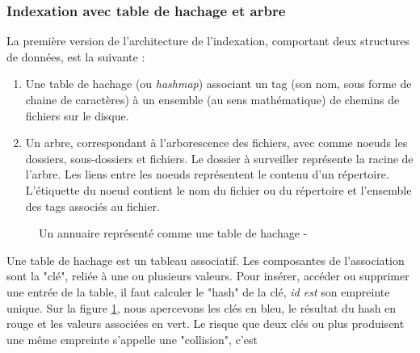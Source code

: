 \documentclass[a4paper, 12pt]{article}
\begin{document}
\subsubsection{Indexation avec table de hachage et arbre}\label{indexation_hashmap_arbre}
La première version de l'architecture de l'indexation, comportant deux structures 
de données, est la suivante :
\begin{enumerate}
    \item Une table de hachage (ou \textit{hashmap}) associant un tag (son nom, sous forme de 
        chaine de caractères) à un ensemble (au sens mathématique) de chemins de fichiers sur 
        le disque.
    \item Un arbre, correspondant à l'arborescence des fichiers, avec comme noeuds les dossiers, 
        sous-dossiers et fichiers. Le dossier à surveiller représente la racine de l'arbre.
        Les liens entre les noeuds représentent le contenu d'un répertoire. L'étiquette du noeud 
        contient le nom du fichier ou du répertoire et l'ensemble des tags associés au fichier.
\end{enumerate}
\begin{figure}
    \begin{center}
    \end{center}
    \caption{Un annuaire représenté comme une table de hachage - \cite{ref27}}
    \label{hashmap_wiki}
\end{figure}
Une table de hachage est un tableau associatif. Les composantes de l'association sont la "clé", 
reliée à une ou plusieurs valeurs. Pour insérer, accéder ou supprimer une entrée de la table, 
il faut calculer le "hash" de la clé, \textit{id est} son empreinte unique. Sur la figure \ref{hashmap_wiki}, 
nous apercevons les clés en bleu, le résultat du hash en rouge et les valeurs associées en vert. 
Le risque que deux clés ou plus produisent une même empreinte s'appelle une "collision", c'est 
\end{document}
